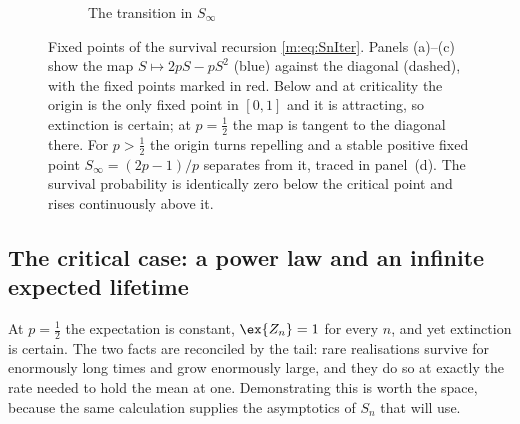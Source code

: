 \begin{figure}[htbp]
    \vspace{10pt}
    \begin{subfigure}[b]{0.55\textwidth}
    \centering
    \caption{The transition in $S_\infty$}
    \end{subfigure}

    \caption{Fixed points of the survival recursion \cref{m:eq:SnIter}. Panels
    (a)--(c) show the map $S\mapsto 2pS-pS^2$ (blue) against the diagonal (dashed),
    with the fixed points marked in red. Below and at criticality the origin is the
    only fixed point in $[0,1]$ and it is attracting, so extinction is certain; at
    $p=\tfrac12$ the map is tangent to the diagonal there. For $p>\tfrac12$ the
    origin turns repelling and a stable positive fixed point $S_\infty=(2p-1)/p$
    separates from it, traced in panel~(d). The survival probability is identically
    zero below the critical point and rises continuously above it.}
    \label{m:fig:phase_transition}
\end{figure}

\subsection{The critical case: a power law and an infinite expected lifetime}
\label{m:sec:criticalcase}

At $p=\tfrac12$ the expectation is constant, $\ex{Z_n}=1$ for every $n$, and yet
extinction is certain. The two facts are reconciled by the tail: rare realisations
survive for enormously long times and grow enormously large, and they do so at
exactly the rate needed to hold the mean at one. Demonstrating this is worth the
space, because the same calculation supplies the asymptotics of $S_n$ that
\ChA will use.

